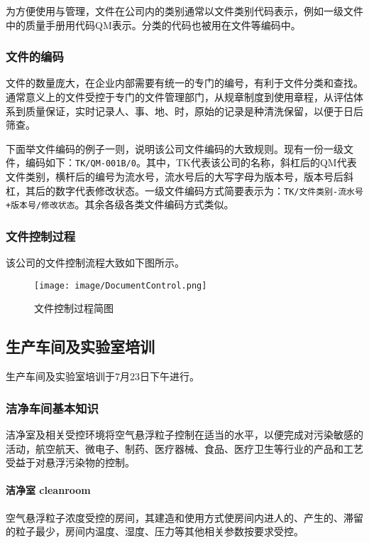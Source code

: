 为方便使用与管理，文件在公司内的类别通常以文件类别代码表示，例如一级文件中的质量手册用代码QM表示。分类的代码也被用在文件等编码中。

\subsubsection{文件的编码} 文件的数量庞大，在企业内部需要有统一的专门的编号，有利于文件分类和查找。通常意义上的文件受控于专门的文件管理部门，从规章制度到使用章程，从评估体系到质量保证，实时记录人、事、地、时，原始的记录是种清洗保留，以便于日后筛查。

下面举文件编码的例子一则，说明该公司文件编码的大致规则。现有一份一级文件，编码如下：\texttt{TK/QM-001B/0}。其中，TK代表该公司的名称，斜杠后的QM代表文件类别，横杆后的编号为流水号，流水号后的大写字母为版本号，版本号后斜杠，其后的数字代表修改状态。一级文件编码方式简要表示为：\texttt{TK/文件类别-流水号+版本号/修改状态}。其余各级各类文件编码方式类似。

\subsubsection{文件控制过程}

该公司的文件控制流程大致如下图所示。

\begin{figure}[H]
    \centering
    \texttt{[image: image/DocumentControl.png]}
    \caption{文件控制过程简图}
    \label{FC}
\end{figure}

\subsection{生产车间及实验室培训}
生产车间及实验室培训于7月23日下午进行。

\subsubsection{洁净车间基本知识}
洁净室及相关受控环境将空气悬浮粒子控制在适当的水平，以便完成对污染敏感的活动，航空航天、微电子、制药、医疗器械、食品、医疗卫生等行业的产品和工艺受益于对悬浮污染物的控制。

\paragraph{洁净室 cleanroom} 空气悬浮粒子浓度受控的房间，其建造和使用方式使房间内进人的、产生的、滞留的粒子最少，房间内温度、湿度、压力等其他相关参数按要求受控。

